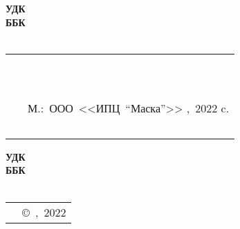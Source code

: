 {
\thispagestyle{empty}
%
\small{
\begin{flushleft}
\textbf{%
	УДК \UDK \\
	ББК \BBK \\
	\BibCode \\
}
\end{flushleft}
%
\vspace{3cm}
%
\begin{flushright}
{
\begin{tabular}[c]{>{\raggedright}m{14mm} >{\raggedright}m{95mm} }
	\textbf{\BibCode} & \MyVarAuthorName \tabularnewline
	~ & \MyVarBookName \tabularnewline
	~ & \MyVarBookNamesec \tabularnewline
	~ & М.:~ООО~<<ИПЦ~"`Маска"'>> ,~2022\mdash 128 c. \tabularnewline
	~ & \textbf{\ISBN}
\end{tabular}
}
\end{flushright}
%
\vspace{4.0cm}
%
\begin{flushright}
\textbf{%
	УДК \UDK \\
	ББК \BBK \\
	\BibCode \\
}
\end{flushright}
%
\vspace{1.0cm}
%
}
{
\begin{longtable}[c]{>{\raggedright}m{55mm} >{\raggedleft}m{55mm} }
	\textbf{\ISBN} & {\copyright~\MyVarAuthorName,~2022} \tabularnewline
\end{longtable}
}
}